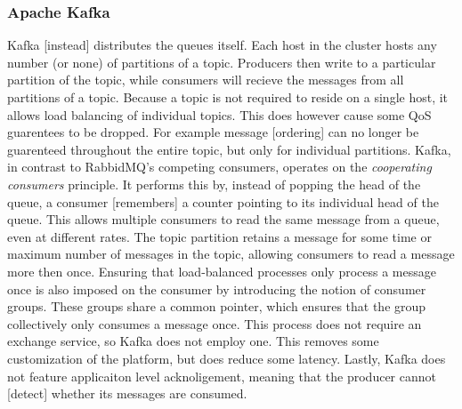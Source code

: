 \subsubsection{Apache Kafka}
Kafka [instead] distributes the queues itself. Each host in the cluster hosts any number (or none) of partitions of a topic. Producers then write to a particular partition of the topic, while consumers will recieve the messages from all partitions of a topic. Because a topic is not required to reside on a single host, it allows load balancing of individual topics. This does however cause some QoS guarentees to be dropped. For example message [ordering] can no longer be guarenteed throughout the entire topic, but only for individual partitions. Kafka, in contrast to RabbidMQ's competing consumers, operates on the \emph{cooperating consumers} principle. It performs this by, instead of popping the head of the queue, a consumer [remembers] a counter pointing to its individual head of the queue. This allows multiple consumers to read the same message from a queue, even at different rates. The topic partition retains a message for some time or maximum number of messages in the topic, allowing consumers to read a message more then once. Ensuring that load-balanced processes only process a message once is also imposed on the consumer by introducing the notion of consumer groups. These groups share a common pointer, which ensures that the group collectively only consumes a message once. This process does not require an exchange service, so Kafka does not employ one. This removes some customization of the platform, but does reduce some latency. Lastly, Kafka does not feature applicaiton level acknoligement, meaning that the producer cannot [detect] whether its messages are consumed.


